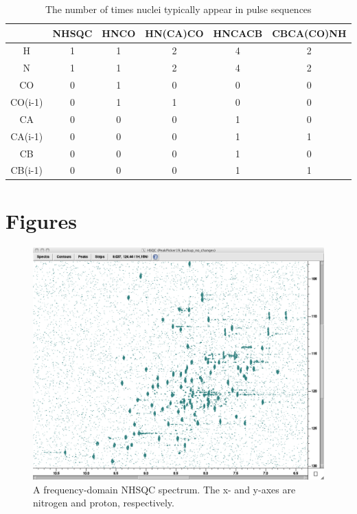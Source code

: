 \begin{table}[h] %
    \begin{tabular}{ | c || c | c | c | c | c |}
    \hline
              & NHSQC & HNCO & HN(CA)CO & HNCACB & CBCA(CO)NH \\
    \hline
      H       & 1 & 1 & 2 & 4 & 2 \\
    \hline
      N       & 1 & 1 & 2 & 4 & 2 \\
    \hline
      CO      & 0 & 1 & 0 & 0 & 0 \\
    \hline
      CO(i-1) & 0 & 1 & 1 & 0 & 0 \\
    \hline
      CA      & 0 & 0 & 0 & 1 & 0 \\
    \hline
      CA(i-1) & 0 & 0 & 0 & 1 & 1 \\
    \hline
      CB      & 0 & 0 & 0 & 1 & 0 \\
    \hline
      CB(i-1) & 0 & 0 & 0 & 1 & 1 \\
    \hline
    \end{tabular}
    \caption{The number of times nuclei typically appear in pulse sequences}
    \label{pulse_sequences}
\end{table}


\clearpage
\section{Figures}

\begin{figure}[h]
  \includegraphics[scale=0.35]{figures/nhsqc}
  \caption[A frequency-domain NHSQC spectrum]
          {A frequency-domain NHSQC spectrum. 
           The x- and y-axes are nitrogen and proton, respectively.}
  \label{nhsqc}
\end{figure}


